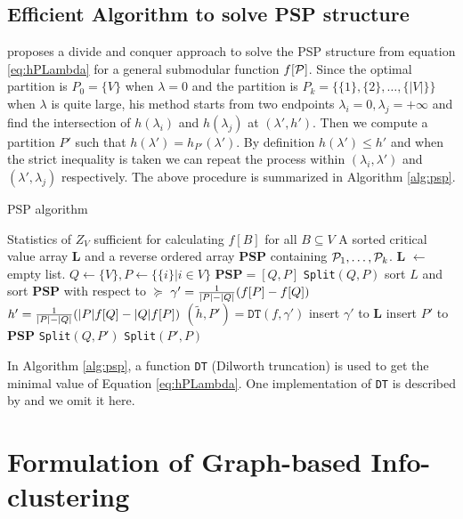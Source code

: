 \subsection{Efficient Algorithm to solve PSP structure}
\cite{narayanan} proposes a divide and conquer approach to solve the PSP structure from equation \eqref{eq:hPLambda} for a general submodular function $f[\P]$.
Since the optimal partition is $P_0 = \{V\}$ when $\lambda=0$ and the partition is $P_k=\{\{1\}, \{2\}, \dots, \{|V|\}\}$ when $\lambda$ is quite large,
his method starts from two endpoints $\lambda_i = 0, \lambda_j = +\infty$ and find the intersection of 
$h(\lambda_i)$ and $h(\lambda_j)$ at $(\lambda', h')$. Then we compute a partition $P'$ such that $h(\lambda') = h_{P'}(\lambda')$. By definition $h(\lambda') \leq h'$ and when the strict inequality is taken we can repeat the process within $(\lambda_i, \lambda')$ and $(\lambda', \lambda_j)$ respectively. The above procedure is summarized in Algorithm \ref{alg:psp}.
\begin{algorithm}
\caption{PSP algorithm}\label{alg:psp}
\begin{algorithmic}[1]
\REQUIRE Statistics of $Z_V$ sufficient for calculating $f[B]$ for all $B \subseteq V$
\ENSURE A sorted critical value array \textbf{L} and a reverse ordered array \textbf{PSP} containing $\P_1,\dots, \P_k$.
\STATE \textbf{L}  $\leftarrow$ empty list.
\STATE $Q\leftarrow \{V\}, P \leftarrow \{ \{i \} | i \in V\}$
\STATE $\mathbf{PSP}= [Q, P]$
\STATE \texttt{Split}$(Q,P)$
\STATE sort $L$ and sort $\mathbf{PSP}$ with respect to $\succeq$ 
 \STATE\label{alg:gamma} $\gamma' = {1 \over \abs{P} - \abs{Q}} (f[P]-f[Q])$
 \STATE $h' = {1 \over \abs{P} - \abs{Q}}(\abs{P} f[Q] - \abs{Q} f[P])$
 \STATE $(\tilde{h}, P') = \texttt{DT}(f,\gamma')$ \footnotemark
 	\STATE\label{line:11} insert $\gamma'$ to $\mathbf{L}$
 \ELSE
 	\STATE insert $P'$ to $\mathbf{PSP}$
 	\STATE \texttt{Split}$(Q, P')$
 	\STATE \texttt{Split}$(P',P)$
 \ENDIF
\ENDFUNCTION
\end{algorithmic}
\end{algorithm}

In Algorithm \ref{alg:psp}, a function \texttt{DT} (Dilworth truncation) is used to get the minimal value of Equation \eqref{eq:hPLambda}.
One implementation of \texttt{DT} is described by \cite{mac} and we omit it here.

\section{Formulation of Graph-based Info-clustering}\label{sec:GBIC}

